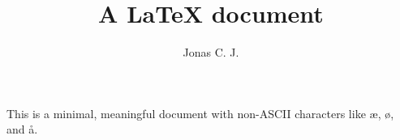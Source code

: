 \documentclass[a4paper, 12pt]{article}
\title{A \LaTeX{} document}
\author{Jonas C. J.}
\begin{document}
\maketitle
This is a minimal, meaningful document with non-ASCII characters like æ, ø, and å. 
\end{document}
